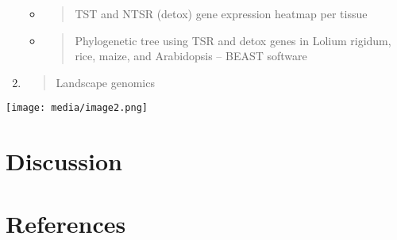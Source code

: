 \begin{enumerate}
  \begin{itemize}
  \item
    \begin{quote}
    TST and NTSR (detox) gene expression heatmap per tissue
    \end{quote}
  \item
    \begin{quote}
    Phylogenetic tree using TSR and detox genes in Lolium rigidum, rice,
    maize, and Arabidopsis -- BEAST software
    \end{quote}
  \end{itemize}
\item
  \begin{quote}
  Landscape genomics
  \end{quote}
\end{enumerate}

\texttt{[image: media/image2.png]}

\hypertarget{section-1}{%
\section{\texorpdfstring{\hfill\break
}{ }}\label{section-1}}

\hypertarget{discussion}{%
\section{Discussion}\label{discussion}}

\hypertarget{references}{%
\section{References}\label{references}}
